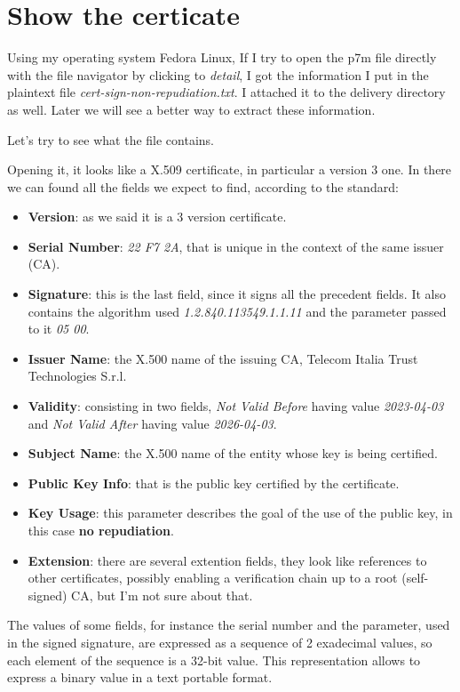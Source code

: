 \documentclass{article}
\begin{document}
\section{Show the certicate}

Using my operating system Fedora Linux, 
If I try to open the p7m file directly with the file navigator by
clicking to \emph{detail}, I got the information I put in the
plaintext file \emph{cert-sign-non-repudiation.txt}.
I attached it to the delivery directory as well.
Later we will see a better way to extract these information.

Let's try to see what the file contains.

Opening it, it looks like a X.509 certificate, in particular a version 3 one.
In there we can found all the fields we expect to find,
according to the standard:

\begin{itemize}
	\item \textbf{Version}: as we said it is a 3 version certificate.
	\item \textbf{Serial Number}: \emph{22 F7 2A}, that is unique in the context of the same issuer (CA).
	\item \textbf{Signature}: this is the last field, since it signs all the precedent fields.
	It also contains the algorithm used \emph{1.2.840.113549.1.1.11} and the parameter passed to it \emph{05 00}.
	\item \textbf{Issuer Name}: the X.500 name of the issuing CA, Telecom Italia Trust Technologies S.r.l.
	\item \textbf{Validity}: consisting in two fields, \emph{Not Valid Before} having value \emph{2023-04-03} and 
	\emph{Not Valid After} having value \emph{2026-04-03}. 
	\item \textbf{Subject Name}: the X.500 name of the entity whose key is being certified.
	\item \textbf{Public Key Info}: that is the public key certified by the certificate.
	\item \textbf{Key Usage}: this parameter describes the goal of the use of the public key, in this case \textbf{no repudiation}.
	\item \textbf{Extension}: there are several extention fields, they look like references to other certificates,
	possibly enabling a verification chain up to a root (self-signed) CA, but I'm not sure about that.
\end{itemize}

The values of some fields, for instance the serial number and the parameter, used in the signed signature, 
are expressed as a sequence of 2 exadecimal values, so each element of the sequence is a 32-bit value.
This representation allows to express a binary value in a text portable format.
\end{document}
